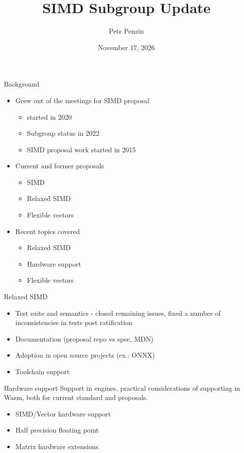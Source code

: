 \documentclass{beamer}
\title{SIMD Subgroup Update}
\author{Petr Penzin}
\date{November 17, 2026}
\begin{document}
\begin{frame}

\titlepage

\end{frame}

\begin{frame}{Background}


\begin{itemize}
\item Grew out of the meetings for SIMD proposal
  \begin{itemize}
  \item started in 2020
  \item Subgroup status in 2022
  \item SIMD proposal work started in 2015
  \end{itemize}
\item Current and former proposals
  \begin{itemize}
  \item SIMD
  \item Relaxed SIMD
  \item Flexible vectors
  \end{itemize}
\item Recent topics covered
  \begin{itemize}
  \item Relaxed SIMD
  \item Hardware support
  \item Flexible vectors
  \end{itemize}
\end{itemize}

\end{frame}

\begin{frame}{Relaxed SIMD}
\begin{itemize}
\item Test suite and semantics - closed remaining issues, fixed a number of inconsistencies in tests post ratification
\item Documentation (proposal repo vs spec, MDN)
\item Adoption in open source projects (ex.: ONNX)
\item Toolchain support
\end{itemize}

\end{frame}

\begin{frame}{Hardware support}
Support in engines, practical considerations of supporting in Wasm, both for current standard and proposals.
\begin{itemize}
\item SIMD/Vector hardware support
\item Half precision floating point
\item Matrix hardware extensions
\end{itemize}
\end{frame}
\end{document}
